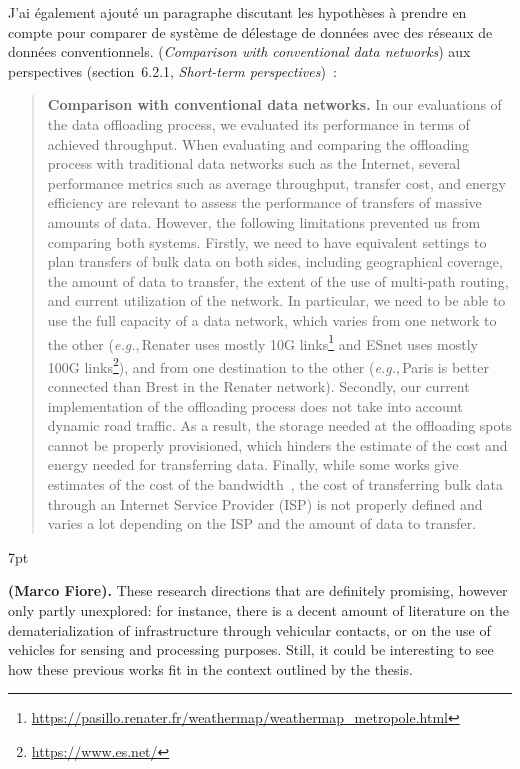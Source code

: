 \documentclass[11pt]{article}
\newcommand{\eg}{\textit{e.g.},\,}
\newenvironment{formal}{%
  \vspace*{-5pt}
  \def\FrameCommand{%
    \hspace{-5pt}%
    {\color{gray50}\vrule width 1.25pt}%
    \colorbox{formalcolor}%
  }%
  \MakeFramed{\advance\hsize-\width\FrameRestore}%
  \noindent\hspace{-4.55pt}%
  \begin{adjustwidth}{}{7pt}%
  \normalsize
  \vspace{-2pt}
}
{%
  \vspace{2pt}\end{adjustwidth}\endMakeFramed%
  \vspace*{-10pt}
}
\begin{document}
J'ai également ajouté un paragraphe discutant les hypothèses à prendre en compte pour comparer de système de délestage de données avec des réseaux de données conventionnels. (\textit{Comparison with conventional data networks}) aux perspectives (section~6.2.1, \textit{Short-term perspectives})~:

\begin{quote}
\noindent\textbf{Comparison with conventional data networks.}
In our evaluations of the data offloading process, we evaluated its performance in terms of achieved throughput. When evaluating and comparing the offloading process with traditional data networks such as the Internet, several performance metrics such as average throughput, transfer cost, and energy efficiency are relevant to assess the performance of transfers of massive amounts of data. However, the following limitations prevented us from comparing both systems. Firstly, we need to have equivalent settings to plan transfers of bulk data on both sides, including geographical coverage, the amount of data to transfer, the extent of the use of multi-path routing, and current utilization of the network. In particular, we need to be able to use the full capacity of a data network, which varies from one network to the other (\eg Renater uses mostly 10G links\footnote{\url{https://pasillo.renater.fr/weathermap/weathermap_metropole.html}} and ESnet uses mostly 100G links\footnote{\url{https://www.es.net/}}), and from one destination to the other (\eg Paris is better connected than Brest in the Renater network). Secondly, our current implementation of the offloading process does not take into account dynamic road traffic. As a result, the storage needed at the offloading spots cannot be properly provisioned, which hinders the estimate of the cost and energy needed for transferring data. Finally, while some works give estimates of the cost of the bandwidth~\cite{laoutaris2013delay,jin2016optimizing}, the cost of transferring bulk data through an Internet Service Provider (ISP) is not properly defined and varies a lot depending on the ISP and the amount of data to transfer.
\end{quote}

\begin{formal}
\textbf{(Marco Fiore).} These research directions that are definitely promising, however only partly unexplored: for instance, there is a decent amount of literature on the dematerialization of infrastructure through vehicular contacts, or on the use of vehicles for sensing and processing purposes. Still, it could be interesting to see how these previous works fit in the context outlined by the thesis.
\end{formal}
\end{document}
